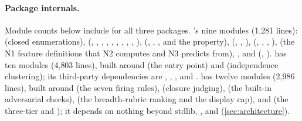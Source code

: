 \paragraph{Package internals.} Module counts below include  for all three
packages. 's nine modules (1{,}281 lines): 
(closed enumerations),  (, , ,
, , , , ,
, ),  (, ,
, and the  property),  (,
, ),  (, ,
, ),  (the N1 feature definitions that N2 computes
and N3 predicts from), , and  (,
).  has ten modules (4{,}803 lines), built around
 (the  entry point) and  (independence
clustering); its third-party dependencies are , , , and
.  has twelve modules (2{,}986 lines), built around 
(the seven firing rules),  (closure judging),  (the built-in
adversarial checks),  (the breadth-rubric ranking and the display cap), and
 (the three-tier  and ); it depends on nothing beyond
stdlib, , and  (\cref{sec:architecture}).

